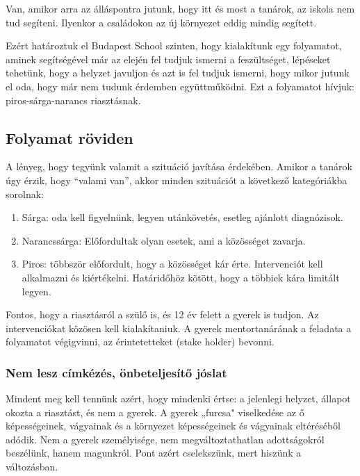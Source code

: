 Van, amikor arra az álláspontra jutunk, hogy itt és most a tanárok, az
iskola nem tud segíteni. Ilyenkor a családokon az új környezet eddig
mindig segített.

Ezért határoztuk el Budapest School szinten, hogy kialakítunk egy
folyamatot, aminek segítségével már az elején fel tudjuk ismerni a
feszültséget, lépéseket tehetünk, hogy a helyzet javuljon és azt is fel
tudjuk ismerni, hogy mikor jutunk el oda, hogy már nem tudunk érdemben
együttműködni. Ezt a folyamatot hívjuk: piros-sárga-narancs riasztásnak.

\hypertarget{folyamat-roviden}{%
\subsection{Folyamat röviden}\label{folyamat-roviden}}

A lényeg, hogy tegyünk valamit a szituáció javítása érdekében. Amikor a
tanárok úgy érzik, hogy ``valami van'', akkor minden szituációt a
következő kategóriákba sorolnak:

\begin{enumerate}
\def\labelenumi{\arabic{enumi}.}
\tightlist
\item
  Sárga: oda kell figyelnünk, legyen utánkövetés, esetleg ajánlott
  diagnózisok.
\item
  Narancssárga: Előfordultak olyan esetek, ami a közösséget zavarja.
\item
  Piros: többször előfordult, hogy a közösséget kár érte. Intervenciót
  kell alkalmazni és kiértékelni. Határidőhöz kötött, hogy a többiek
  kára limitált legyen.
\end{enumerate}

Fontos, hogy a riasztásról a szülő is, és 12 év felett a gyerek is
tudjon. Az intervenciókat közösen kell kialakítaniuk. A gyerek
mentortanárának a feladata a folyamatot végigvinni, az érintetetteket
(stake holder) bevonni.

\hypertarget{nem-lesz-cimkezes-onbeteljesito-joslat}{%
\subsubsection{Nem lesz címkézés, önbeteljesítő
jóslat}\label{nem-lesz-cimkezes-onbeteljesito-joslat}}

Mindent meg kell tennünk azért, hogy mindenki értse: a jelenlegi
helyzet, állapot okozta a riasztást, és nem a gyerek. A gyerek „furcsa"
viselkedése az ő képességeinek, vágyainak és a környezet képességeinek
és vágyainak eltéréséből adódik. Nem a gyerek személyisége, nem
megváltoztathatlan adottságokról beszélünk, hanem magunkról. Pont azért
cselekszünk, mert hiszünk a változásban.

